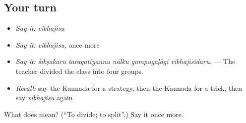 \subsection*{Your turn}
\begin{itemize}
\raggedright
  \item \emph{Say it:} \emph{vibhajisu}
  \item \emph{Say it:} \emph{vibhajisu}, once more
  \item \emph{Say it:} \emph{śikṣakaru taragatiyannu nālku gumpugaḷāgi vibhajisidaru.} — The teacher divided the class into four groups.
  \item \emph{Recall:} say the Kannada for a strategy, then the Kannada for a trick, then say \emph{vibhajisu} again
\end{itemize}

\begin{tcolorbox}[breakable,colback=teal!4,colframe=teal!35!black,title={Before you move on}]
What does  mean? (\textquotedblleft{}To divide; to split\textquotedblright{}.) Say it once more.
\end{tcolorbox}
